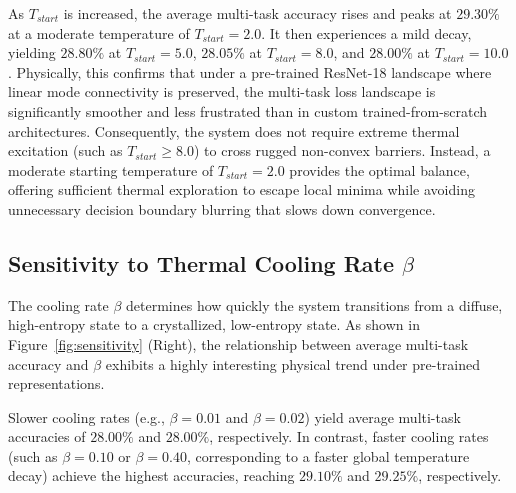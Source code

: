 \documentclass{article}
\theoremstyle{plain}
\theoremstyle{definition}
\theoremstyle{remark}
\begin{document}
As $T_{start}$ is increased, the average multi-task accuracy rises and peaks at $29.30\%$ at a moderate temperature of $T_{start} = 2.0$. It then experiences a mild decay, yielding $28.80\%$ at $T_{start} = 5.0$, $28.05\%$ at $T_{start} = 8.0$, and $28.00\%$ at $T_{start} = 10.0$. Physically, this confirms that under a pre-trained ResNet-18 landscape where linear mode connectivity is preserved, the multi-task loss landscape is significantly smoother and less frustrated than in custom trained-from-scratch architectures. Consequently, the system does not require extreme thermal excitation (such as $T_{start} \ge 8.0$) to cross rugged non-convex barriers. Instead, a moderate starting temperature of $T_{start} = 2.0$ provides the optimal balance, offering sufficient thermal exploration to escape local minima while avoiding unnecessary decision boundary blurring that slows down convergence.

\subsection{Sensitivity to Thermal Cooling Rate $\beta$}
The cooling rate $\beta$ determines how quickly the system transitions from a diffuse, high-entropy state to a crystallized, low-entropy state. As shown in Figure~\ref{fig:sensitivity} (Right), the relationship between average multi-task accuracy and $\beta$ exhibits a highly interesting physical trend under pre-trained representations.

Slower cooling rates (e.g., $\beta = 0.01$ and $\beta = 0.02$) yield average multi-task accuracies of $28.00\%$ and $28.00\%$, respectively. In contrast, faster cooling rates (such as $\beta = 0.10$ or $\beta = 0.40$, corresponding to a faster global temperature decay) achieve the highest accuracies, reaching $29.10\%$ and $29.25\%$, respectively.
\end{document}
